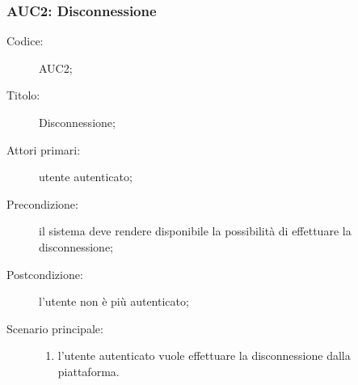 \documentclass[../../../analisi-dei-requisiti.tex]{subfiles}
\begin{document}
\subsubsection{AUC2: Disconnessione}%
\label{subs:AUC2}

\begin{description}
  \item[Codice:] AUC2;
  \item[Titolo:] Disconnessione;
  \item[Attori primari:] utente autenticato;
  \item[Precondizione:] il sistema deve rendere disponibile la possibilità di effettuare la disconnessione;
  \item[Postcondizione:] l'utente non è più autenticato;
  \item[Scenario principale:]
  \begin{enumerate}
    \item l'utente autenticato vuole effettuare la disconnessione dalla piattaforma.
  \end{enumerate}
\end{description}
\end{document}
